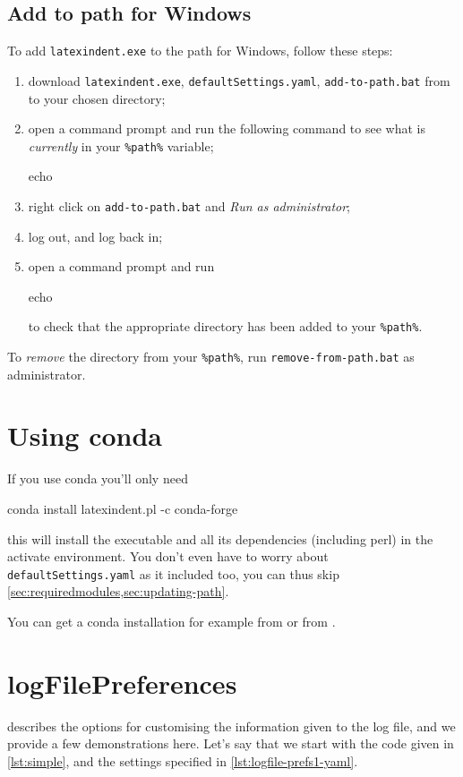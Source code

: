 	\subsection{Add to path for Windows}
		To add \texttt{latexindent.exe} to the path for Windows, follow these steps:
		\begin{enumerate}
			\item download \texttt{latexindent.exe}, \texttt{defaultSettings.yaml},
			      \texttt{add-to-path.bat} from \cite{latexindent-home} to your chosen directory;
			\item open a command prompt and run the following command to see what is \emph{currently} in
			      your \lstinline!%path%! variable;
			      \begin{dosprompt}
echo %
          \end{dosprompt}
			\item right click on \texttt{add-to-path.bat} and \emph{Run as administrator};
			\item log out, and log back in;
			\item open a command prompt and run
			      \begin{dosprompt}
echo %
          \end{dosprompt}
			      to check that the appropriate directory has been added to your \lstinline!%path%!.
		\end{enumerate}
		To \emph{remove} the directory from your \lstinline!%path%!, run
		\texttt{remove-from-path.bat} as administrator.

        \section{Using conda}
        If you use conda you'll only need

        \begin{commandshell}
conda install latexindent.pl -c conda-forge
\end{commandshell}
this will install the executable and all its dependencies (including perl) in the activate environment.
You don't even have to worry about \texttt{defaultSettings.yaml} as it included too,
you can thus skip \cref{sec:requiredmodules,sec:updating-path}.

You can get a conda installation for example from \cite{conda} or from \cite{anacoda}.

	\section{logFilePreferences}\label{app:logfile-demo}
	  describes the options for customising the information given
	 to the log file, and we provide a few demonstrations here. Let's say that we start with
	 the code given in \cref{lst:simple}, and the settings specified in
	 \cref{lst:logfile-prefs1-yaml}.

